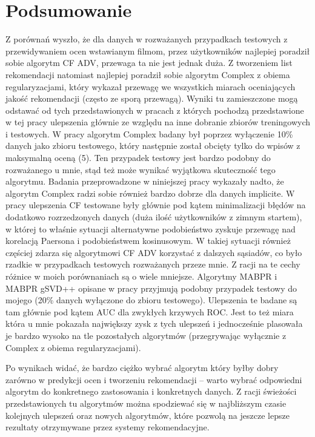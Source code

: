 \documentclass{pracamgr}
\begin{document}
   \section{Podsumowanie}
    Z porównań wyszło, że dla danych \cite{ML} w rozważanych przypadkach testowych z przewidywaniem ocen wstawianym filmom, przez użytkowników
    najlepiej poradził sobie algorytm CF ADV, przewaga ta nie jest jednak duża.
    Z tworzeniem list rekomendacji natomiast najlepiej poradził sobie algorytm Complex z obiema regularyzacjami,
    który wykazał przewagę we wszystkich miarach oceniających jakość rekomendacji (często ze sporą przewagą).\newline
    Wyniki tu zamieszczone mogą odstawać od tych przedstawionych w pracach z których pochodzą przedstawione w tej pracy ulepszenia głównie ze względu na inne 
    dobranie zbiorów treningowych i testowych.\newline
    W pracy \cite{205} algorytm Complex badany był poprzez wyłączenie 10\% danych jako zbioru testowego, który następnie został obcięty tylko do wpisów z
    maksymalną oceną (5). Ten przypadek testowy jest bardzo podobny do rozważanego u mnie, stąd też może wynikać wyjątkowa skuteczność tego algorytmu.
    Badania przeprowadzone w niniejszej pracy wykazały nadto, że algorytm Complex radzi sobie również bardzo dobrze dla danych implicite.\newline
    W pracy \cite{221} ulepszenia CF testowane były głównie pod kątem minimalizacji błędów na dodatkowo rozrzedzonych danych
    (duża ilość użytkowników z zimnym startem), w której to właśnie sytuacji alternatywne podobieństwo zyskuje przewagę nad korelacją Paersona
    i podobieństwem kosinusowym. W takiej sytuacji również częściej zdarza się algorytmowi CF ADV korzystać z dalszych sąsiadów, co było rzadkie 
    w przypadkach testowych rozważanych przeze mnie. Z racji na te cechy różnice w moich porównaniach są o wiele mniejsze.\newline
    Algorytmy MABPR i MABPR gSVD++ opisane w pracy \cite{191} przyjmują podobny przypadek testowy do mojego (20\% danych wyłączone do zbioru testowego).
    Ulepszenia te badane są tam głównie pod kątem AUC dla zwykłych krzywych ROC. Jest to też miara która u mnie pokazała największy zysk z tych ulepszeń
    i jednocześnie plasowała je bardzo wysoko na tle pozostałych algorytmów (przegrywając wyłącznie z Complex z obiema regularyzacjami).\newline
    
    Po wynikach widać, że bardzo ciężko wybrać algorytm który byłby dobry zarówno w predykcji ocen i tworzeniu rekomendacji -- warto wybrać odpowiedni algorytm
    do konkretnego zastosowania i konkretnych danych.
    Z racji świeżości przedstawionych tu algorytmów można spodziewać się w najbliższym czasie kolejnych ulepszeń oraz nowych algorytmów,
    które pozwolą na jeszcze lepsze rezultaty otrzymywane przez systemy rekomendacyjne.
    
\end{document}
